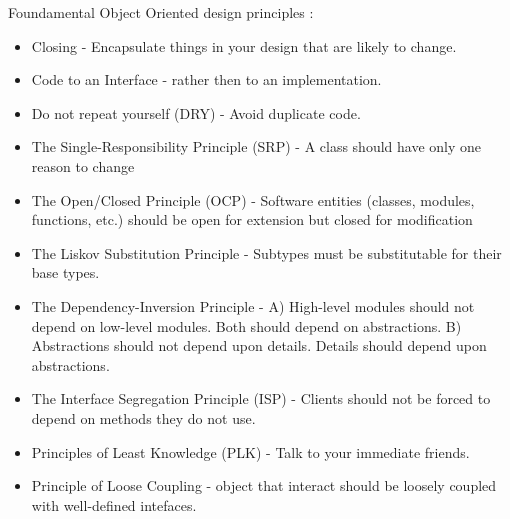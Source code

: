 Foundamental Object Oriented design principles\cite{Dooley}\cite{MartinASD} :
\begin{itemize}
 \item Closing - Encapsulate things in your design that are likely to change.
 \item Code to an Interface - rather then to an implementation. 
 \item Do not repeat yourself (DRY) - Avoid duplicate code.
 \item The Single-Responsibility Principle (SRP) - A class should have only one reason to change
 \item The Open/Closed Principle (OCP) - Software entities (classes, modules, functions, etc.) should be open for extension but closed for modification
 \item The Liskov Substitution Principle - Subtypes must be substitutable for their base types.
 \item The Dependency-Inversion Principle - A) High-level modules should not depend on low-level modules. 
Both should depend on abstractions. 
B) Abstractions should not depend upon details. 
Details should depend upon abstractions.
 \item The Interface Segregation Principle (ISP) - Clients should not be forced to depend on methods they do not use.
 \item Principles of Least Knowledge (PLK) - Talk to your immediate friends. 
 \item Principle of Loose Coupling - object that interact should be loosely coupled with well-defined intefaces.
\end{itemize}



